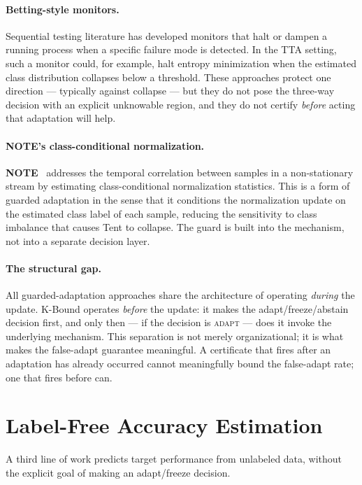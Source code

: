 \paragraph{Betting-style monitors.}
Sequential testing literature has developed monitors that halt or dampen a
running process when a specific failure mode is detected.
In the TTA setting, such a monitor could, for example, halt entropy
minimization when the estimated class distribution collapses below a threshold.
These approaches protect one direction --- typically against collapse --- but
they do not pose the three-way decision with an explicit unknowable region,
and they do not certify \emph{before} acting that adaptation will help.

\paragraph{NOTE's class-conditional normalization.}
\textbf{NOTE}~\cite{gong2022note} addresses the temporal correlation between
samples in a non-stationary stream by estimating class-conditional
normalization statistics.
This is a form of guarded adaptation in the sense that it conditions the
normalization update on the estimated class label of each sample, reducing
the sensitivity to class imbalance that causes Tent to collapse.
The guard is built into the mechanism, not into a separate decision layer.

\paragraph{The structural gap.}
All guarded-adaptation approaches share the architecture of operating
\emph{during} the update.
K-Bound operates \emph{before} the update: it makes the adapt/freeze/abstain
decision first, and only then --- if the decision is \textsc{adapt} ---
does it invoke the underlying mechanism.
This separation is not merely organizational; it is what makes the
false-adapt guarantee meaningful.
A certificate that fires after an adaptation has already occurred cannot
meaningfully bound the false-adapt rate; one that fires before can.

\section{Label-Free Accuracy Estimation}\label{sec:rel-estimation}

A third line of work predicts target performance from unlabeled data, without
the explicit goal of making an adapt/freeze decision.

